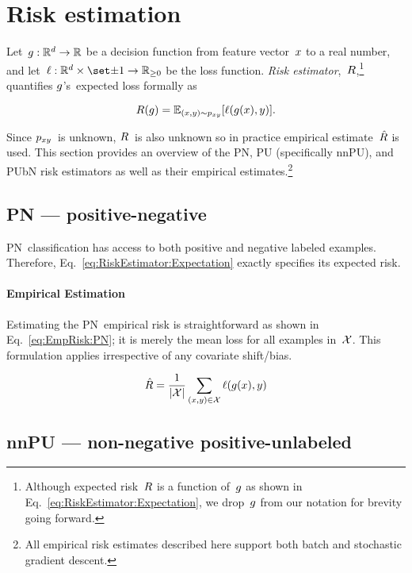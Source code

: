 \section{Risk estimation}\label{sec:RiskEstimators}

Let~${g:\mathbb{R}^{d}\rightarrow\mathbb{R}}$ be a decision function from feature vector~$x$ to a real number, and let~$\func{\loss}{\domainX \times \domainY}{\real_{{\geq}0}}$ be the loss function.  \textit{Risk estimator},~$R$,\footnote{Although expected risk~$R$ is a function of~$g$ as shown in Eq.~\eqref{eq:RiskEstimator:Expectation}, we drop~$g$ from our notation for brevity going forward.} quantifies $g$'s~expected loss formally as

\begin{equation}\label{eq:RiskEstimator:Expectation}
  R(g) = \mathbb{E}_{(x,y) \sim p_{xy}}\lbrack\ell\mathopen{}\left(g\mathopen{}\left(x\right)\mathclose{},y\right)\mathclose{}\rbrack\text{.}
\end{equation}

Since $p_{xy}$~is unknown, $R$~is also unknown so in practice empirical estimate~$\hat{R}$ is used.  This section provides an overview of the PN, PU (specifically nnPU), and PUbN risk estimators as well as their empirical estimates.\footnote{All empirical risk estimates described here support both batch and stochastic gradient descent.}

\subsection{PN --- positive-negative}

PN~classification has access to both positive and negative labeled examples.  Therefore, Eq.~\eqref{eq:RiskEstimator:Expectation} exactly specifies its expected risk.

\paragraph{Empirical Estimation} Estimating the PN~empirical risk is straightforward as shown in Eq.~\eqref{eq:EmpRisk:PN}; it is merely the mean loss for all examples in~$\mathcal{X}$.  This formulation applies irrespective of any covariate shift/bias.

\begin{equation}\label{eq:EmpRisk:PN}
  \hat{R} = \frac{1}{\lvert\mathcal{X}\rvert} \sum_{(x,y) \in \mathcal{X}} \ell\mathopen{}\left(g\mathopen{}\left(x\right)\mathclose{},y\right)\mathclose{}
\end{equation}

\subsection{nnPU --- non-negative positive-unlabeled}

